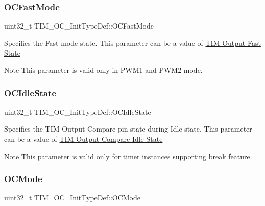 \subsubsection{\texorpdfstring{O\+C\+Fast\+Mode}{OCFastMode}}
{\footnotesize\ttfamily uint32\+\_\+t T\+I\+M\+\_\+\+O\+C\+\_\+\+Init\+Type\+Def\+::\+O\+C\+Fast\+Mode}

Specifies the Fast mode state. This parameter can be a value of \hyperlink{group___t_i_m___output___fast___state}{T\+IM Output Fast State} \begin{DoxyNote}{Note}
This parameter is valid only in P\+W\+M1 and P\+W\+M2 mode. 
\end{DoxyNote}
\mbox{\label{struct_t_i_m___o_c___init_type_def_ace3e2b76ca2fca0f4961585ed9ebecf5}} 
\subsubsection{\texorpdfstring{O\+C\+Idle\+State}{OCIdleState}}
{\footnotesize\ttfamily uint32\+\_\+t T\+I\+M\+\_\+\+O\+C\+\_\+\+Init\+Type\+Def\+::\+O\+C\+Idle\+State}

Specifies the T\+IM Output Compare pin state during Idle state. This parameter can be a value of \hyperlink{group___t_i_m___output___compare___idle___state}{T\+IM Output Compare Idle State} \begin{DoxyNote}{Note}
This parameter is valid only for timer instances supporting break feature. 
\end{DoxyNote}
\mbox{\label{struct_t_i_m___o_c___init_type_def_ae5faa1cba0b3f1ab6179cc54e1015ee8}} 
\subsubsection{\texorpdfstring{O\+C\+Mode}{OCMode}}
{\footnotesize\ttfamily uint32\+\_\+t T\+I\+M\+\_\+\+O\+C\+\_\+\+Init\+Type\+Def\+::\+O\+C\+Mode}

